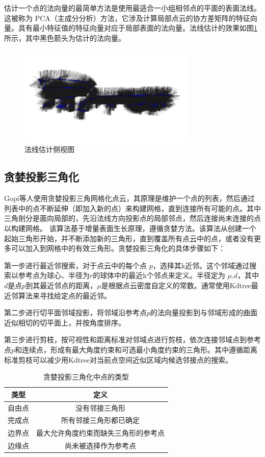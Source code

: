 估计一个点的法向量的最简单方法是使用最适合一小组相邻点的平面的表面法线。这被称为 PCA（主成分分析）方法，它涉及计算局部点云的协方差矩阵的特征向量。具有最小特征值的特征向量对应于局部表面的法向量。法线估计的效果如图\ref{fig:normal_estimation}所示，其中黑色箭头为估计的法向量。
\begin{figure}[htbp]
    \centering
    \includegraphics[width=0.75\textwidth]{figures/normal_estimation.png}
    \caption{法线估计侧视图}
    \label{fig:normal_estimation}
\end{figure}

\subsection{贪婪投影三角化}
Gopi等人\cite{gopiFastEfficientProjectionbased2002}使用贪婪投影三角网格化点云，其原理是维护一个点的列表，然后通过列表中的点不断延伸（即加入新的点）来构建网格，直到连接所有可能的点。其中三角剖分是面向局部的，先沿法线方向投影点的局部邻点，然后连接尚未连接的点以构建网格。
该算法基于增量表面生长原理，遵循贪婪方法。该算法从创建一个起始三角形开始，并不断添加新的三角形，直到覆盖所有点云中的点，或者没有更多可以加入到网格中的有效三角形。贪婪投影三角化的具体步骤如下：

第一步进行最近邻搜索，对于点云中的每个点 $p$，选择其k近邻。这个邻域通过搜索以参考点为球心、半径为$r$的球体中的最近k个邻点来定义。半径定为 $\mu .d$，其中$d$是点$p$到其最近邻点的距离，$\mu$是根据点云密度自定义的常数。通常使用Kdtree最近邻算法来寻找给定点的最近邻。

第二步进行切平面邻域投影，将邻域沿参考点$p$的法向量投影到与邻域形成的曲面近似相切的切平面上，并按角度排序。

第三步进行剪枝，按可视性和距离标准对邻域点进行剪枝，依次连接邻域点到参考点$p$和连续点，形成有最大角度约束和可选最小角度约束的三角形。其中遵循距离标准剪枝可以减少用Kdtree对当前点空间近似区域内候选邻接点的搜索。

\begin{table}[htbp]
    \centering
    \caption{贪婪投影三角化中点的类型} \label{tab:point-triangle}
    \begin{tabular*}{0.75\textwidth}{@{\extracolsep{\fill}}cc}
    \toprule
      类型&定义\\
      \midrule
      自由点&没有邻接三角形\\
      完成点	&所有邻接三角形都已确定\\
      边界点	&最大允许角度约束而缺失三角形的参考点\\
      边缘点	&尚未被选择作为参考点\\
    \bottomrule
    \end{tabular*}
\end{table}

